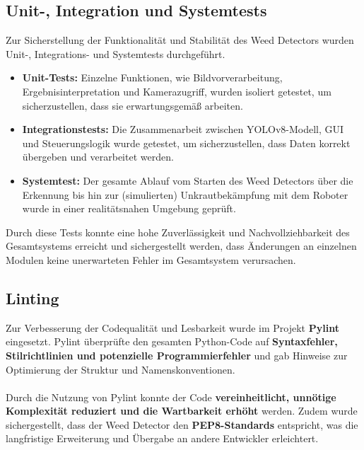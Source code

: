 \documentclass[12pt]{scrartcl}
\begin{document}
\subsection{Unit-, Integration und Systemtests}
Zur Sicherstellung der Funktionalität und Stabilität des Weed Detectors wurden Unit-, Integrations- und Systemtests durchgeführt.
\begin{itemize}
    \item \textbf{Unit-Tests:} Einzelne Funktionen, wie Bildvorverarbeitung, Ergebnisinterpretation und Kamerazugriff, wurden isoliert getestet, um sicherzustellen, dass sie erwartungsgemäß arbeiten.
    \item \textbf{Integrationstests:} Die Zusammenarbeit zwischen YOLOv8-Modell, GUI und Steuerungslogik wurde getestet, um sicherzustellen, dass Daten korrekt übergeben und verarbeitet werden.
    \item \textbf{Systemtest:} Der gesamte Ablauf vom Starten des Weed Detectors über die Erkennung bis hin zur (simulierten) Unkrautbekämpfung mit dem Roboter wurde in einer realitätsnahen Umgebung geprüft.
\end{itemize}
Durch diese Tests konnte eine hohe Zuverlässigkeit und Nachvollziehbarkeit des Gesamtsystems erreicht und sichergestellt werden, dass Änderungen an einzelnen Modulen keine unerwarteten Fehler im Gesamtsystem verursachen.

\subsection{Linting}
Zur Verbesserung der Codequalität und Lesbarkeit wurde im Projekt \textbf{Pylint} eingesetzt. Pylint überprüfte den gesamten Python-Code auf \textbf{Syntaxfehler, Stilrichtlinien und potenzielle Programmierfehler} und gab Hinweise zur Optimierung der Struktur und Namenskonventionen.\\
\\
Durch die Nutzung von Pylint konnte der Code \textbf{vereinheitlicht, unnötige Komplexität reduziert und die Wartbarkeit erhöht} werden. Zudem wurde sichergestellt, dass der Weed Detector den \textbf{PEP8-Standards} entspricht, was die langfristige Erweiterung und Übergabe an andere Entwickler erleichtert.
\end{document}
